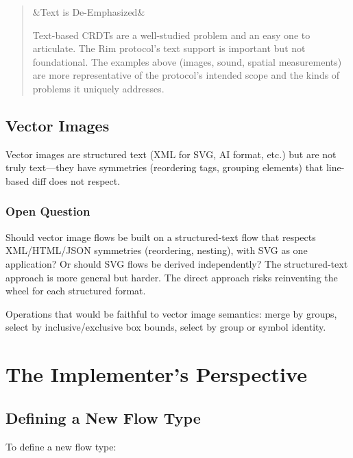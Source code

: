 \documentclass[11pt, letterpaper]{article}
\newenvironment{designnote}[1][]
  {\par\medskip\begin{quote}\small
   \ifx&#1&\else\noindent{\bfseries\color{jetcolor} #1}\par\smallskip\fi}
  {\end{quote}\medskip}
\begin{document}
\begin{designnote}[Text is De-Emphasized]
Text-based CRDTs are a well-studied problem and an easy one to articulate. The Rim
protocol's text support is important but not foundational. The examples above (images,
sound, spatial measurements) are more representative of the protocol's intended scope
and the kinds of problems it uniquely addresses.
\end{designnote}

\subsection{Vector Images}
\label{sec:ex-vector}

Vector images are structured text (XML for SVG, AI format, etc.) but are not truly
text---they have symmetries (reordering tags, grouping elements) that line-based diff
does not respect.

\subsubsection{Open Question}

Should vector image flows be built on a structured-text flow that respects XML/HTML/JSON
symmetries (reordering, nesting), with SVG as one application? Or should SVG flows be
derived independently? The structured-text approach is more general but harder. The
direct approach risks reinventing the wheel for each structured format.

Operations that would be faithful to vector image semantics: merge by groups, select
by inclusive/exclusive box bounds, select by group or symbol identity.


\newpage
\section{The Implementer's Perspective}
\label{sec:implementers}

\subsection{Defining a New Flow Type}

To define a new flow type:
\end{document}
